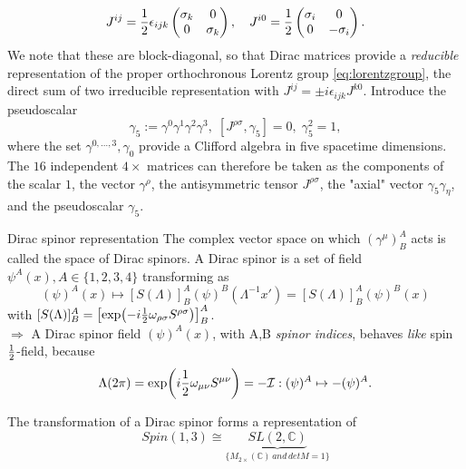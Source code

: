 \begin{equation}
J^{ij} = \frac{1}{2} \epsilon_{ijk} \begin{pmatrix}
\sigma_k &0\\0&\sigma_k\\
\end{pmatrix}
,\quad 
J^{i0} = \frac{1}{2} \begin{pmatrix}
\sigma_i&0\\0&-\sigma_i\\
\end{pmatrix}.
\end{equation}
We note that these are block-diagonal, so that Dirac matrices provide a \emph{reducible} representation of the proper orthochronous Lorentz group \ref{eq:lorentzgroup}, the direct sum of two irreducible representation with $J^{ij} = \pm i \epsilon_{ijk} J^{k0}$. Introduce the pseudoscalar
 \begin{equation}
 	\gamma_5 := \gamma^0\gamma^1 \gamma^2\gamma^3,\; [J^{\rho \sigma},\gamma_5]=0,\; \gamma^2_5=1,
 \end{equation}
 where the set $\gamma^{0,\dots,3},\gamma_0$ provide a Clifford algebra in five spacetime dimensions. The $16$ independent $4\times$ matrices can therefore be taken as the components of the scalar $1$, the vector $\gamma^\rho$, the antisymmetric tensor $J^{\rho \sigma}$, the "axial" vector $\gamma_5\gamma_\eta$, and the pseudoscalar $\gamma_5$.
\begin{mybox}{Dirac spinor representation}
	The complex vector space on which $(\gamma^{\mu})^A_B$ acts is called the space of Dirac spinors. A Dirac spinor is a set of field $\psi^A(x), A\in \{1,2,3,4\}$ transforming as
	\begin{equation}
	(\psi)^A(x) \mapsto [S(\Lambda)]^A_B (\psi)^B (\Lambda^{-1} x') = [S(\Lambda)]^A_B (\psi)^B(x) 
	\end{equation}
	with $[S(\Lambda)]^A_B = \left[\exp(-i \frac{1}{2} \omega_{\rho \sigma} S^{\rho \sigma} )\right]^A_B$.\\
	$\Rightarrow$ A Dirac spinor field $(\psi)^A(x)$, with A,B \emph{spinor indices}, behaves \emph{like} spin $\frac{1}{2}$-field, because
	\begin{equation}
	\Lambda(2 \pi) = \exp(i \frac{1}{2} \omega_{\mu \nu} S^{\mu \nu} ) = - \mathcal{I}: (\psi)^A \mapsto -(\psi)^A.
	\end{equation}
\end{mybox}
The transformation of a Dirac spinor forms a representation of
\begin{equation}
Spin(1,3) \cong \underbrace{SL(2, \mathbb{C})}_{\{M_{2 \times} (\mathbb{C}) \, and \, detM=1 \} }
\end{equation}
